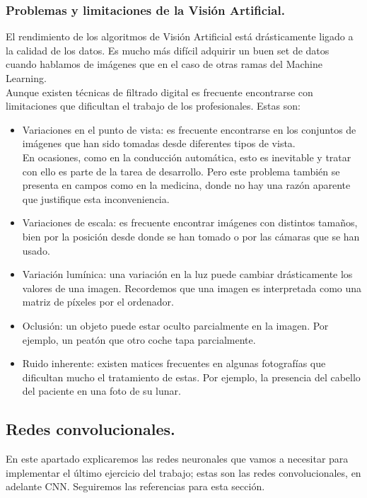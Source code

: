 \documentclass[a4paper,11pt]{article}
\begin{document}
\subsubsection{Problemas y limitaciones de la Visión Artificial.}
El rendimiento de los algoritmos de Visión Artificial está drásticamente ligado a la calidad de los datos. Es mucho más difícil adquirir un buen set de datos cuando hablamos de imágenes que en el caso de otras ramas del Machine Learning.
\\

\noindent
Aunque existen técnicas de filtrado digital es frecuente encontrarse con limitaciones que dificultan el trabajo de los profesionales. Estas son:
\begin{itemize}
\item Variaciones en el punto de vista: es frecuente encontrarse en los conjuntos de imágenes que han sido tomadas desde diferentes tipos de vista. \\
\noindent
En ocasiones, como en la conducción automática, esto es inevitable y tratar con ello es parte de la tarea de desarrollo. Pero este problema también se presenta en campos como en la medicina, donde no hay una razón aparente que justifique esta inconveniencia. 
\item Variaciones de escala: es frecuente encontrar imágenes con distintos tamaños, bien por la posición desde donde se han tomado o por las cámaras que se han usado.
\item Variación lumínica: una variación en la luz puede cambiar drásticamente los valores de una imagen. Recordemos que una imagen es interpretada como una matriz de píxeles por el ordenador.
\item Oclusión:  un objeto puede estar oculto parcialmente en la imagen. Por ejemplo, un peatón que otro coche tapa parcialmente.
\item Ruido inherente: existen matices frecuentes en algunas fotografías que dificultan mucho el tratamiento de estas. Por ejemplo, la presencia del cabello del paciente en una foto de su lunar.

\end{itemize}



\newpage
\subsection{Redes convolucionales.}
En este apartado explicaremos las redes neuronales que vamos a necesitar para implementar el último ejercicio del trabajo; estas son las redes convolucionales, en adelante CNN. Seguiremos las referencias \cite{redes}\cite{otrocurso} para esta sección.\\
\end{document}
